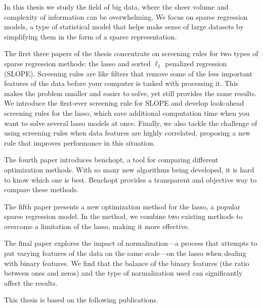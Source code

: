 \documentclass{book}
\begin{document}

In this thesis we study the field of big data, where the sheer volume and complexity of information can be overwhelming. We focus on sparse regression models, a type of statistical model that helps make sense of large datasets by simplifying them in the form of a sparse  representation.

The first three papers of the thesis concentrate on screening rules for two types of sparse regression methods: the lasso and sorted \(\ell_1\) penalized regression (SLOPE). Screening rules are like filters that remove some of the less important features of the data before your computer is tasked with processing it. This makes the problem smaller and easier to solve, yet still provides the same results. We introduce the first-ever screening rule for SLOPE and develop look-ahead screening rules for the lasso, which save additional computation time when you want to solve several lasso models at once. Finally, we also tackle the challenge of using screening rules when data features are highly correlated, proposing a new rule that improves performance in this situation.

The fourth paper introduces benchopt, a tool for comparing different optimization methods. With so many new algorithms being developed, it is hard to know which one is best. Benchopt provides a transparent and objective way to compare these methods.

The fifth paper presents a new optimization method for the lasso, a popular sparse regression model. In the method, we combine two existing methods to overcome a limitation of the lasso, making it more effective.

The final paper explores the impact of normalization---a process that attempts to put varying features of the data on the same scale---on the lasso when dealing with binary features. We find that the balance of the binary features (the ratio between ones and zeros) and the type of normalization used can significantly affect the results.

\label{sec:paperlist}

This thesis is based on the following publications.
\end{document}
